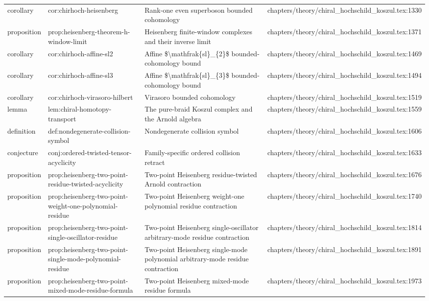 \documentclass[11pt]{article}
\begin{document}
\begin{longtable}{L{0.10\textwidth}L{0.26\textwidth}L{0.42\textwidth}L{0.22\textwidth}}
corollary & cor:chirhoch-heisenberg & Rank-one even superboson bounded cohomology & chapters/theory/chiral\_hochschild\_koszul.tex:1330\\
proposition & prop:heisenberg-theorem-h-window-limit & Heisenberg finite-window complexes and their inverse limit & chapters/theory/chiral\_hochschild\_koszul.tex:1371\\
corollary & cor:chirhoch-affine-sl2 & Affine \$\textbackslash{}mathfrak\{sl\}\_\{2\}\$ bounded-cohomology bound & chapters/theory/chiral\_hochschild\_koszul.tex:1469\\
corollary & cor:chirhoch-affine-sl3 & Affine \$\textbackslash{}mathfrak\{sl\}\_\{3\}\$ bounded-cohomology bound & chapters/theory/chiral\_hochschild\_koszul.tex:1494\\
corollary & cor:chirhoch-virasoro-hilbert & Virasoro bounded cohomology & chapters/theory/chiral\_hochschild\_koszul.tex:1519\\
lemma & lem:chiral-homotopy-transport & The pure-braid Koszul complex and the Arnold algebra & chapters/theory/chiral\_hochschild\_koszul.tex:1559\\
definition & def:nondegenerate-collision-symbol & Nondegenerate collision symbol & chapters/theory/chiral\_hochschild\_koszul.tex:1606\\
conjecture & conj:ordered-twisted-tensor-acyclicity & Family-specific ordered collision retract & chapters/theory/chiral\_hochschild\_koszul.tex:1633\\
proposition & prop:heisenberg-two-point-residue-twisted-acyclicity & Two-point Heisenberg residue-twisted Arnold contraction & chapters/theory/chiral\_hochschild\_koszul.tex:1676\\
proposition & prop:heisenberg-two-point-weight-one-polynomial-residue & Two-point Heisenberg weight-one polynomial residue contraction & chapters/theory/chiral\_hochschild\_koszul.tex:1740\\
proposition & prop:heisenberg-two-point-single-oscillator-residue & Two-point Heisenberg single-oscillator arbitrary-mode residue contraction & chapters/theory/chiral\_hochschild\_koszul.tex:1814\\
proposition & prop:heisenberg-two-point-single-mode-polynomial-residue & Two-point Heisenberg single-mode polynomial arbitrary-mode residue contraction & chapters/theory/chiral\_hochschild\_koszul.tex:1891\\
proposition & prop:heisenberg-two-point-mixed-mode-residue-formula & Two-point Heisenberg mixed-mode residue formula & chapters/theory/chiral\_hochschild\_koszul.tex:1973\\

\end{longtable}
\end{document}
